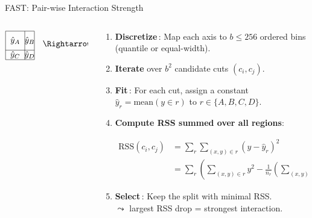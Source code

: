 \documentclass[10pt,compress,t,notes=noshow, xcolor=table]{beamer}
\begin{document}
\begin{frame}{FAST: Pair-wise Interaction Strength}
\begin{columns}[T,totalwidth=\textwidth]
\begin{column}{0.4\textwidth}
{\[\begin{array}{@{}l@{\hskip 0.6em}l@{\hskip 0.6em}l@{\hskip 0.6em}l@{\hskip 0.6em}l}
\begin{tikzpicture}[baseline=(current bounding box.center)]
        \draw (0,0) rectangle (1.2,1.2);
        \draw (0.8,0) -- (0.8,1.2); 
        \draw (0,0.4) -- (1.2,0.4); 
        \node at (0.4,0.2) {$\hat{y}_C$};
        \node at (1,0.2) {$\hat{y}_D$};
        \node at (0.4,0.8) {$\hat{y}_A$};
        \node at (1,0.8) {$\hat{y}_B$};
    \end{tikzpicture} & \text{$\Rightarrow$} & \text{$RSS_{b^2}$}\\ 
\end{array}
\]
}
\end{column}
\begin{column}{0.6\textwidth}
\small
\begin{enumerate}\itemsep4pt
  \item<1-> {\bf Discretize}\,: Map each axis to \(b\!\le\!256\) ordered
        bins (quantile or equal-width).
  \item<2-> {\bf Iterate} over \(b^{2}\) candidate cuts
        \((c_i,c_j)\). %
  \item<2-> {\bf Fit}\,: For each cut, assign a constant
        \(\hat y_r\!=\!\text{mean}(y\!\in\!r)\) to
        \(r\!\in\!\{A,B,C,D\}\).
  \item<2-> {\bf Compute RSS summed over all regions}:   
  {\footnotesize
  \[
\begin{aligned}
\text{RSS}(c_i, c_j) 
&= \sum_{r} \sum_{(x,y) \in r} (y - \hat{y}_r)^2 \\
&= \sum_{r} \left( \sum_{(x,y) \in r} y^2 - \frac{1}{n_r} \left(\sum_{(x,y) \in r} y \right)^2 \right)
\end{aligned}
\]
         
              
 }
  \item<2-> {\bf Select}\,: Keep the split with minimal RSS.\\
  $\leadsto$ largest RSS drop = strongest interaction. \\%
\end{enumerate}

\end{column}
\end{columns}
\end{frame}
\end{document}
